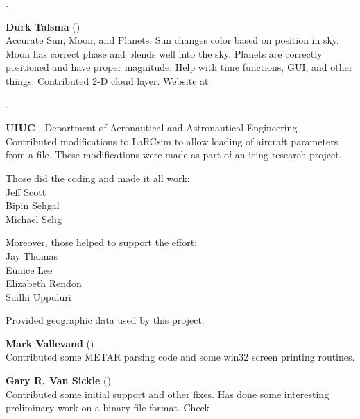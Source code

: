   .
 \medskip

 \noindent
\noindent \textbf{Durk Talsma} ()\\
  Accurate Sun, Moon, and Planets.  Sun changes color based on
  position in sky. Moon has correct phase and blends well into the
  sky.  Planets are correctly positioned and have proper magnitude. Help with time
  functions, GUI, and other things. Contributed 2-D cloud layer. Website
  at
   \medskip

 .
 \medskip

\noindent \textbf{UIUC} - Department of Aeronautical and Astronautical
Engineering\\
  Contributed modifications to LaRCsim to allow loading of aircraft
  parameters from a file.  These modifications were made as part of an
  icing research project.
  \medskip

  Those did the coding and made it all work:\\
      Jeff Scott \\
      Bipin Sehgal \\
      Michael Selig 
  \medskip

  Moreover, those helped to support the effort:\\
      Jay Thomas \\
      Eunice Lee \\
      Elizabeth Rendon \\
      Sudhi Uppuluri 
  \medskip


\noindent
 \textbf{}
  \medskip

 \medskip

 \noindent
  Provided geographic data used by this project.
 \medskip

\noindent \textbf{Mark Vallevand}
()\\
  Contributed some METAR parsing code and some win32 screen printing routines.
\medskip

\noindent \textbf{Gary R. Van Sickle}
()\\
  Contributed some initial  support and other fixes. Has done some
  interesting preliminary work on a binary file format. Check
  \medskip

